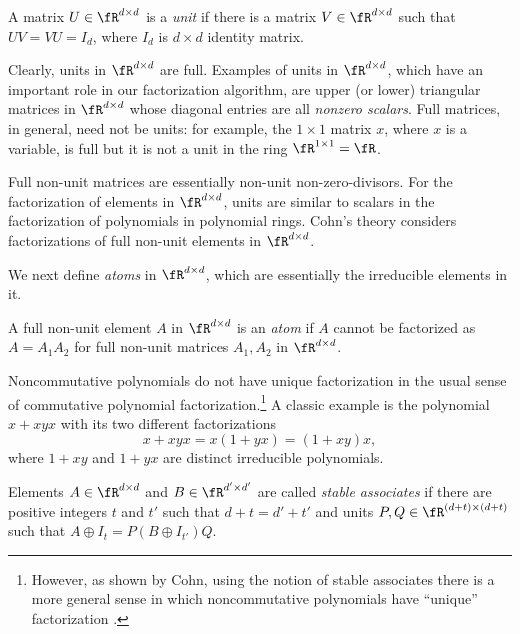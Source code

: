 \begin{definition}
A matrix $U \in \fR^{d\times d}$ is a \emph{unit} if there is a matrix
$V\in \fR^{d\times d}$ such that $UV=VU=I_d$, where $I_d$ is $d \times
d$ identity matrix.
\end{definition}

Clearly, units in $\fR^{d \times d}$ are full. Examples of units in
$\fR^{d\times d}$, which have an important role in our factorization
algorithm, are upper (or lower) triangular matrices in $\fR^{d \times
  d}$ whose diagonal entries are all \emph{nonzero scalars}. Full
matrices, in general, need not be units: for example, the $1\times 1$
matrix $x$, where $x$ is a variable, is full but it is not a unit in
the ring $\fR^{1\times 1}=\fR$.

\begin{remark}
Full non-unit matrices are essentially non-unit non-zero-divisors.
For the factorization of elements in $\fR^{d \times d}$, units are
similar to scalars in the factorization of polynomials in polynomial
rings. Cohn's theory \cite{Cohnfir} considers factorizations of full
non-unit elements in $\fR^{d \times d}$.
\end{remark}
%
%
We next define \emph{atoms} in $\fR^{d\times d}$, which are
essentially the irreducible elements in it.

\begin{definition}
A full non-unit element $A$ in $\fR^{d \times d}$ is an \emph{atom} if
$A$ cannot be factorized as $A=A_1A_2$ for full non-unit matrices
$A_1, A_2$ in $\fR^{d \times d}$.
\end{definition}

Noncommutative polynomials do not have unique factorization in the usual
sense of commutative polynomial factorization.\footnote{However, as
  shown by Cohn, using the notion of stable associates there is a more
  general sense in which noncommutative polynomials have ``unique''
  factorization \cite{Cohnfir}.}  A classic example \cite{Cohnfir} is
the polynomial $x+xyx$ with its two different factorizations
\[
x+xyx = x(1+yx) = (1+xy)x,
\]
where $1+xy$ and $1+yx$ are distinct irreducible polynomials.

\begin{definition}
Elements $A \in \fR^{d \times d}$ and $B \in \fR^{d' \times d'}$ are
called \emph{stable associates} if there are positive integers $t$ and
$t'$ such that $d+t=d'+t'$ and units $P, Q\in\fR^{(d+t)\times (d+t)}$
such that $A\oplus I_t=P(B \oplus I_{t'})Q$.
\end{definition}

